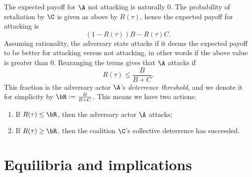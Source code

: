The expected payoff for $\A$ not attacking is naturally $0$. The probability of retaliation by $\C$ is given as above by $R(\tau)$, hence the expected payoff for attacking is 
\[(1-R(\tau))B-R(\tau)C.\]
Assuming rationality, the adversary state attacks if it deems the expected payoff to be better for attacking versus not attacking, in other words if the above value is greater than $0$. Rearanging the terms gives that $\A$ attacks if 
\[R(\tau)\leq \frac{B}{B+C}.\]
This fraction is the adversary actor $\A$'s \emph{deterrence threshold}, and we denote it for simplicity by $\bR := \frac{B}{B+C}$. This means we have two actions:
\begin{enumerate}
    \item If $R(\tau)\leq \bR$, then the adversary actor $\A$ attacks;
    \item If $R(\tau)\geq \bR$, then the coalition $\C$'s collective deterrence has succeeded. 
\end{enumerate}











\section{Equilibria and implications}


